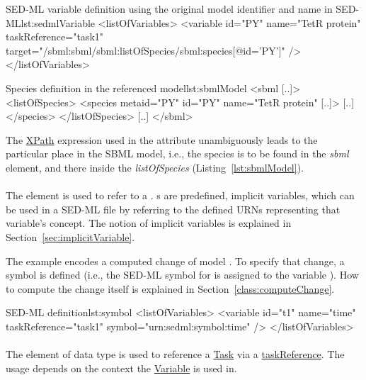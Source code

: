 \begin{myXmlLst}{SED-ML variable definition using the original model identifier and name in SED-ML}{lst:sedmlVariable}
<listOfVariables>
	<variable id="PY" name="TetR protein"  taskReference="task1" 
		target="/sbml:sbml/sbml:listOfSpecies/sbml:species[@id='PY']" />
</listOfVariables>
\end{myXmlLst}

\begin{myXmlLst}{Species definition in the referenced model}{lst:sbmlModel}
<sbml [..]>
	<listOfSpecies>
		<species metaid="PY" id="PY" name="TetR protein" [..]>
		[..]
		</species>
 	</listOfSpecies>
 	[..]
</sbml>
\end{myXmlLst}

The \hyperref[sec:xpath]{XPath} expression used in the  attribute unambiguously leads to the particular place in the SBML model, i.e., the species is to be found in the \emph{sbml} element, and there inside the \emph{listOfSpecies} (Listing~\ref{lst:sbmlModel}). 

\paragraph*{}
\label{sec:symbol}
The  element is used to refer to a . s are predefined, implicit variables, which can be used in a SED-ML file by referring to the defined URNs representing that variable's concept. The notion of implicit variables is explained in Section~\ref{sec:implicitVariable}.

The example encodes a computed change of model . To specify that change, a symbol is defined (i.e., the SED-ML symbol for  is assigned to the variable ). How to compute the change itself is explained in Section~\ref{class:computeChange}.

\begin{myXmlLst}{SED-ML  definition}{lst:symbol}
<listOfVariables>
	<variable id="t1" name="time" taskReference="task1" symbol="urn:sedml:symbol:time" />
</listOfVariables>
\end{myXmlLst}

\paragraph*{}
\label{sec:taskReferenceAttribute}
The  element of data type \hyperref[type:sidref]{} is used to reference a \hyperref[class:task]{Task} via a \hyperref[sec:taskReference]{taskReference}. The usage depends on the context the \hyperref[class:variable]{Variable} is used in.

